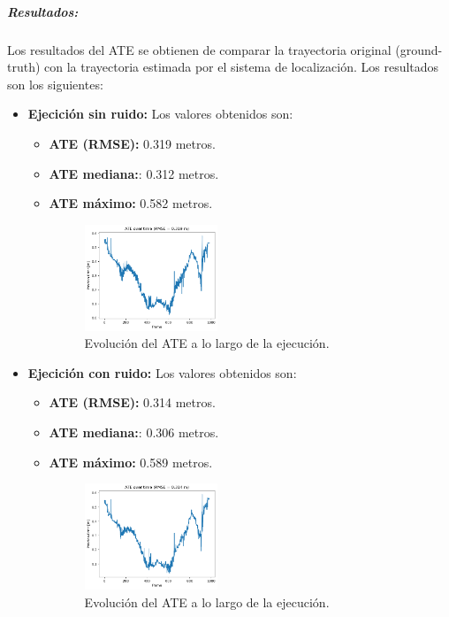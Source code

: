 \documentclass[12pt, a4paper, twoside]{article}
\begin{document}
\subparagraph{Resultados:}
Los resultados del ATE se obtienen de comparar la trayectoria original (ground-truth) con la trayectoria estimada por el sistema de localización. 
Los resultados son los siguientes:
\begin{itemize}
  \item \textbf{Ejecición sin ruido:} Los valores obtenidos son:
  \begin{itemize}
    \item \textbf{ATE (RMSE):} 0.319 metros.
    \item \textbf{ATE mediana:}: 0.312 metros.
    \item \textbf{ATE máximo:} 0.582 metros.
    \begin{figure}[h]
      \centering
        \includegraphics[width=0.4\textwidth]{ate_clean.png}
      \caption{Evolución del ATE a lo largo de la ejecución.}
    \end{figure} 
  \end{itemize}
  \item \textbf{Ejecición con ruido:} Los valores obtenidos son:
  \begin{itemize}
    \item \textbf{ATE (RMSE):} 0.314 metros.
    \item \textbf{ATE mediana:}: 0.306 metros.
    \item \textbf{ATE máximo:} 0.589 metros.
    \begin{figure}[h]
      \centering
        \includegraphics[width=0.4\textwidth]{ate_noisy.png}
      \caption{Evolución del ATE a lo largo de la ejecución.}
    \end{figure} 
  \end{itemize}
\end{itemize}
\end{document}
